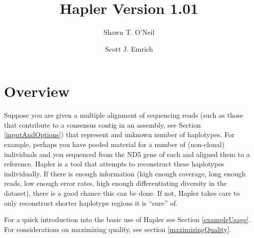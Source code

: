 \documentclass[11pt]{llncs}
\begin{document}
%
%
\mainmatter              %
%
\title{Hapler Version 1.01}
%
%
\author{Shawn T. O'Neil \and Scott J. Emrich}
%
%
%




\maketitle              %


\setcounter{tocdepth}{3}
\tableofcontents

\newpage


%

\section{Overview} 
\label{overview}

Suppose you are given a multiple alignment of sequencing reads (such as those that contribute to a consensus contig in an assembly, see Section 
\ref{inputAndOptions}) that represent and unknown number of haplotypes. For example, perhaps you have pooled material for a number of (non-clonal) 
individuals and you sequenced from the ND5 gene of each and aligned them to a reference. Hapler is a tool that attempts to reconstruct these 
haplotypes individually. If there is enough information (high enough coverage, long enough reads, low enough error rates, high enough differentiating 
diversity in the dataset), there is a good chance this can be done. If not, Hapler takes care to only reconstruct shorter haplotype regions it is 
``sure'' of.

For a quick introduction into the basic use of Hapler see Section \ref{exampleUsage}. For considerations on maximizing quality, see section 
\ref{maximizingQuality}.
\end{document}
